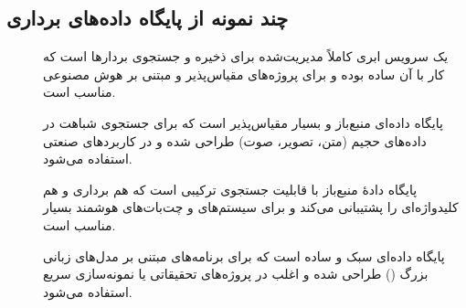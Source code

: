 \documentclass{article}
\begin{document}
\subsection{چند نمونه از پایگاه داده‌های برداری }
\begin{description}
\item[] یک سرویس ابری کاملاً مدیریت‌شده برای ذخیره و جستجوی بردارها است که کار با آن ساده بوده و برای پروژه‌های مقیاس‌پذیر و مبتنی بر هوش مصنوعی مناسب است.

\item[] پایگاه داده‌ای منبع‌باز و بسیار مقیاس‌پذیر است که برای جستجوی شباهت در داده‌های حجیم (متن، تصویر، صوت) طراحی شده و در کاربردهای صنعتی استفاده می‌شود.

\item[] پایگاه دادهٔ منبع‌باز با قابلیت جستجوی ترکیبی است که هم برداری و هم کلیدواژه‌ای را پشتیبانی می‌کند و برای سیستم‌های  و چت‌بات‌های هوشمند بسیار مناسب است.

\item[] پایگاه داده‌ای سبک و ساده است که برای برنامه‌های مبتنی بر مدل‌های زبانی بزرگ () طراحی شده و اغلب در پروژه‌های تحقیقاتی یا نمونه‌سازی سریع استفاده می‌شود.

\end{description}


\end{document}
